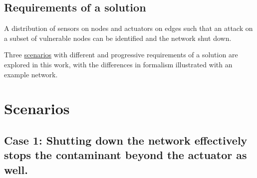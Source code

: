 \documentclass[authoryear,preprint,review,12pt]{elsarticle}
\begin{document}
\subsection{Requirements of a solution} %
A distribution of sensors on nodes and actuators on edges such
that an attack on a subset of vulnerable nodes can be identified and
the network shut down.

Three \hyperref[sec:Scenarios]{scenarios} with different and progressive requirements
of a solution are explored in this work, with the differences in formalism illustrated
with an example network.






%
%
%
%


\section{Scenarios \label{sec:Scenarios}}


\subsection{Case 1: Shutting down the network effectively stops the contaminant
beyond the actuator as well.} %
\end{document}
